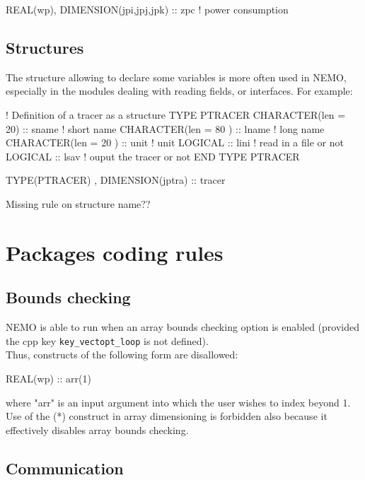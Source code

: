 \documentclass{article}
\begin{document}
\begin{forlines}
REAL(wp), DIMENSION(jpi,jpj,jpk) ::  zpc      ! power consumption
\end{forlines}

\subsection{Structures}

The  structure allowing to declare some variables is more often used in NEMO,
especially in the modules dealing with reading fields, or interfaces.
For example:

\begin{forlines}
! Definition of a tracer as a structure
TYPE PTRACER
   CHARACTER(len = 20)  :: sname  ! short name
   CHARACTER(len = 80 ) :: lname  ! long name
   CHARACTER(len = 20 ) :: unit   ! unit
   LOGICAL              :: lini   ! read in a file or not
   LOGICAL              :: lsav   ! ouput the tracer or not
END TYPE PTRACER

TYPE(PTRACER) , DIMENSION(jptra) :: tracer
\end{forlines}

Missing rule on structure name??

\section{Packages coding rules}

\subsection{Bounds checking}

NEMO is able to run when an array bounds checking option is enabled
(provided the cpp key \texttt{key\_vectopt\_loop} is not defined). \\
Thus, constructs of the following form are disallowed:

\begin{forlines}
REAL(wp) :: arr(1)
\end{forlines}

where "arr" is an input argument into which the user wishes to index beyond 1.
Use of the (*) construct in array dimensioning is forbidden also because
it effectively disables array bounds checking.

\subsection{Communication}
\end{document}
